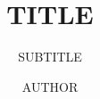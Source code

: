 \documentclass[krantzl,letterpaper]{tex/krantz}
\begin{document}
\title{TITLE}
\subtitle{SUBTITLE}
\author{AUTHOR}
\maketitle

\frontmatter
\tableofcontents

\mainmatter
\end{document}
